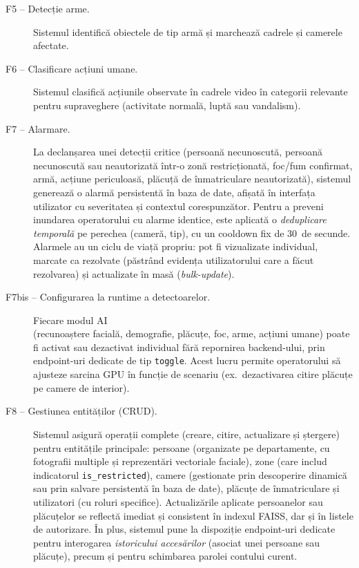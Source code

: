 \documentclass[../../main.tex]{subfiles}
\begin{document}
\begin{description}
    \item[F5 -- Detecție arme.] Sistemul identifică obiectele de tip armă și marchează cadrele și camerele afectate.

    \item[F6 -- Clasificare acțiuni umane.] Sistemul clasifică acțiunile observate în cadrele video în categorii relevante pentru supraveghere (activitate normală, luptă sau vandalism).

    \item[F7 -- Alarmare.] La declanșarea unei detecții critice (persoană necunoscută, persoană necunoscută sau neautorizată într-o zonă restricționată, foc/fum confirmat, armă, acțiune periculoasă, plăcuță de înmatriculare neautorizată), sistemul generează o alarmă persistentă în baza de date, afișată în interfața utilizator cu severitatea și contextul corespunzător. Pentru a preveni inundarea operatorului cu alarme identice, este aplicată o \emph{deduplicare temporală} pe perechea (cameră, tip), cu un cooldown fix de 30~de secunde. Alarmele au un ciclu de viață propriu: pot fi vizualizate individual, marcate ca rezolvate (păstrând evidența utilizatorului care a făcut rezolvarea) și actualizate în masă (\emph{bulk-update}).

    \item[F7bis -- Configurarea la runtime a detectoarelor.] Fiecare modul AI\\ (recunoaștere facială, demografie, plăcuțe, foc, arme, acțiuni umane) poate fi activat sau dezactivat individual fără repornirea backend-ului, prin \linebreak endpoint-uri dedicate de tip \texttt{toggle}. Acest lucru permite operatorului să ajusteze sarcina GPU în funcție de scenariu (ex.\ dezactivarea citire plăcuțe pe camere de interior).

	\item[F8 -- Gestiunea entităților (CRUD).] Sistemul asigură operații complete (creare, citire, actualizare și ștergere) pentru entitățile principale: persoane (organizate pe departamente, cu fotografii multiple și reprezentări vectoriale faciale), zone (care includ indicatorul \texttt{is\_restricted}), camere (gestionate prin descoperire dinamică sau prin salvare persistentă în baza de date), plăcuțe de înmatriculare și utilizatori (cu roluri specifice). Actualizările aplicate persoanelor sau plăcuțelor se reflectă imediat și consistent în indexul FAISS, dar și în listele de autorizare. În plus, sistemul pune la dispoziție endpoint-uri dedicate pentru interogarea \emph{istoricului accesărilor} (asociat unei persoane sau plăcuțe), precum și pentru schimbarea parolei contului curent.


\end{description}
\end{document}
